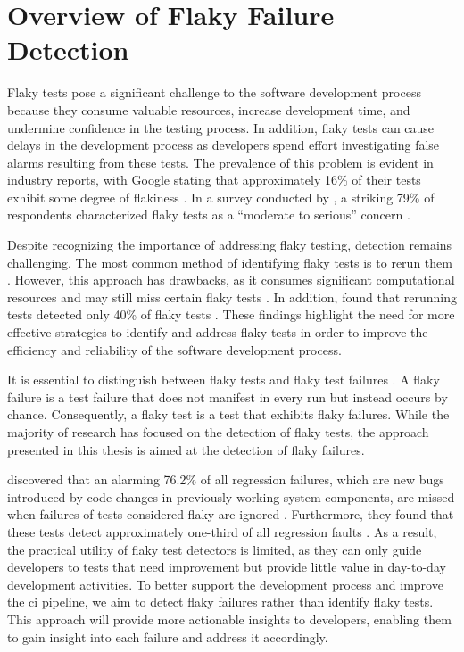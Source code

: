 \section{Overview of Flaky Failure Detection}
Flaky tests pose a significant challenge to the software development process because they consume valuable resources, increase development time, and undermine confidence in the testing process.
In addition, flaky tests can cause delays in the development process as developers spend effort investigating false alarms resulting from these tests.
The prevalence of this problem is evident in industry reports, with Google stating that approximately 16\% of their tests exhibit some degree of flakiness \autocite{micco_state_2017}.
In a survey conducted by \citeauthor*{eck_understanding_2019}, a striking 79\% of respondents characterized flaky tests as a \enquote{moderate to serious} concern \autocite{eck_understanding_2019}.

Despite recognizing the importance of addressing flaky testing, detection remains challenging.
The most common method of identifying flaky tests is to rerun them \autocite{lam_idflakies_2019, lam_understanding_2020}.
However, this approach has drawbacks, as it consumes significant computational resources and may still miss certain flaky tests \autocite{bell_deflaker_2018, luo_empirical_2014}.
In addition, \citeauthor*{parry_what_2022} found that rerunning tests detected only 40\% of flaky tests \autocite{parry_what_2022}.
These findings highlight the need for more effective strategies to identify and address flaky tests in order to improve the efficiency and reliability of the software development process.

It is essential to distinguish between flaky tests and flaky test failures \autocite{haben_importance_2023}.
A flaky failure is a test failure that does not manifest in every run but instead occurs by chance.
Consequently, a flaky test is a test that exhibits flaky failures.
While the majority of research has focused on the detection of flaky tests, the approach presented in this thesis is aimed at the detection of flaky failures.

 discovered that an alarming 76.2\% of all regression failures, which are new bugs introduced by code changes in previously working system components, are missed when failures of tests considered flaky are ignored \autocite{haben_importance_2023}.
Furthermore, they found that these tests detect approximately one-third of all regression faults \autocite{haben_importance_2023}.
As a result, the practical utility of flaky test detectors is limited, as they can only guide developers to tests that need improvement but provide little value in day-to-day development activities.
To better support the development process and improve the \ac{ci} pipeline, we aim to detect flaky failures rather than identify flaky tests.
This approach will provide more actionable insights to developers, enabling them to gain insight into each failure and address it accordingly.

